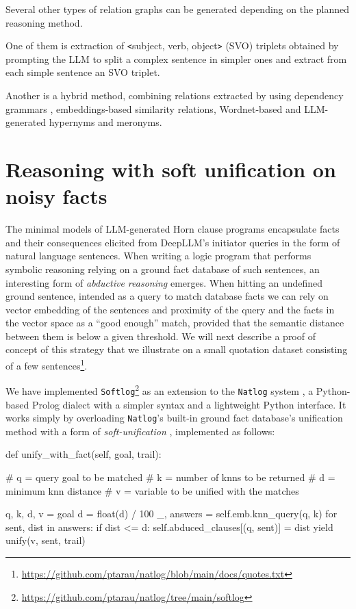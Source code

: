 \documentclass[submission,copyright,creativecommons]{eptcs}
\begin{document}
Several other types of relation graphs can be generated depending on the planned reasoning method.

One of them is extraction of  \verb~<~subject, verb, object\verb~>~ (SVO) triplets obtained by prompting the LLM to split a complex sentence in simpler ones and extract from each simple sentence an SVO triplet.

Another is a hybrid method, combining relations extracted by using dependency grammars \cite{tplp21}, embeddings-based similarity relations, Wordnet-based and LLM-generated hypernyms and meronyms. 


\section{Reasoning with soft unification on noisy facts}\label{soft}

The minimal models of LLM-generated Horn clause programs encapsulate
facts and their consequences elicited from DeepLLM's initiator queries
in the form of natural language sentences.
When writing a logic program that performs symbolic reasoning
relying on a ground fact database of such sentences, an interesting
form of {\em abductive reasoning} emerges.
When hitting an undefined ground sentence, intended as a query to match
database facts we can rely on vector embedding of the sentences and proximity
of the query and the facts in the vector space as a ``good enough'' match,
provided that the semantic distance between them is below a given threshold.
We will next describe a proof of concept of this strategy that we illustrate
on a small quotation dataset consisting of a few
sentences\footnote{\url{https://github.com/ptarau/natlog/blob/main/docs/quotes.txt}}.

We have implemented  {\tt Softlog}\footnote{\url{https://github.com/ptarau/natlog/tree/main/softlog}} as
an extension to the {\tt Natlog} system \cite{iclp21,iclp23natlog}, a Python-based 
Prolog dialect with a simpler syntax and a lightweight Python interface.
It works simply by overloading {\tt Natlog}'s built-in ground fact database's unification method with a form of {\em soft-unification} \cite{soft_unif,ltn22,deepsoftlog23}, implemented as follows:

\begin{code}
     def unify_with_fact(self, goal, trail):
     
        # q = query goal to be matched
        # k = number of knns to be returned
        # d = minimum knn distance
        # v = variable to be unified with the matches
        
        q, k, d, v = goal
        d = float(d) / 100
        _, answers = self.emb.knn_query(q, k)
        for sent, dist in answers:
            if dist <= d:
                self.abduced_clauses[(q, sent)] = dist
                yield unify(v, sent, trail)
\end{code}
\end{document}

